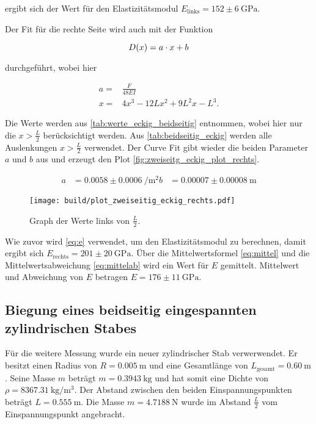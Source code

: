 ergibt sich der Wert für den Elastizitätsmodul $E_\text{links} = 152 \pm \SI{6}{\giga\pascal}$.

Der Fit für die rechte Seite wird auch mit der Funktion

\begin{equation}
    D(x) = a \cdot x + b \\
    \label{eq:durchbiegung_beidseitig2}
\end{equation} 

durchgeführt, wobei hier 

\begin{align}
    a =& \frac{F}{48EI} \\
    x =& 4x^3 - 12Lx^2 + 9L^2x - L^3.
\end{align}

Die Werte werden aus \autoref{tab:werte_eckig_beidseitig} entnommen, wobei hier nur die $x > \frac{L}{2}$ berücksichtigt werden.
Aus \autoref{tab:beidseitig_eckig} werden alle Auslenkungen $x > \frac{L}{2}$ verwendet.
Der Curve Fit gibt wieder die beiden Parameter $a$ und $b$ aus und erzeugt den Plot \autoref{fig:zweiseitg_eckig_plot_rechts}.

\begin{align}
    a &= 0.0058 \pm \SI{0.0006}{\per \meter\squared}
    b &= 0.00007 \pm \SI{0.00008}{\meter}
\end{align}

\begin{figure}
    \centering
    \texttt{[image: build/plot\_zweiseitig\_eckig\_rechts.pdf]}
    \caption{Graph der Werte links von $\frac{L}{2}$.}
    \label{fig:zweiseitg_eckig_plot_rechts}
\end{figure}

Wie zuvor wird \autoref{eq:e} verwendet, um den Elastizitätsmodul zu berechnen, damit ergibt sich $E_\text{rechts} = 201 \pm \SI{20}{\giga\pascal}$.
Über die Mittelwertsformel \autoref{eq:mittel} und die Mittelwertsabweichung \autoref{eq:mittelab} wird ein Wert für $E$ gemittelt.
Mittelwert und Abweichung von $E$ betragen $E = 176 \pm \SI{11}{\giga\pascal}$.

\subsection{Biegung eines beidseitig eingespannten zylindrischen Stabes}
\label{Biegung eines beidseitig eingespannten zylindrischen Stabes}

Für die weitere Messung wurde ein neuer zylindrischer Stab verwerwendet. 
Er besitzt einen Radius von $R = \SI{0.005}{\meter}$ und eine Gesamtlänge von $L_\text{gesamt} = \SI{0.60}{\meter} $. 
Seine Masse $m$ beträgt $m = \SI{0.3943}{\kilogram}$ und hat somit eine Dichte von $\rho = \SI{8367.31}{\kilogram \per \cubic\meter}$. 
Der Abstand zwischen den beiden Einspannungspunkten beträgt $L = \SI{0.555}{\meter}$. 
Die Masse $m = \SI{4.7188}{\newton}$ wurde im Abstand $\frac{L}{2}$ vom Einspannungspunkt angebracht. 

